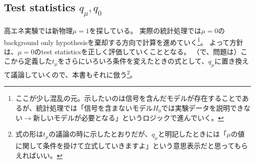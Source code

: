 \documentclass[a4paper,uplatex]{jsreport}
\begin{document}
\subsection{Test statistics $q_\mu,q_0$}
高エネ実験では新物理$\mu=1$を探している。
実際の統計処理では$\mu=0$のbackground only hypothesisを棄却する方向で計算を進めていく\footnote{ここが少し混乱の元。示したいのは信号を含んだモデルが存在することであるが、統計処理では「信号を含まないモデル$H_0$では実験データを説明できない$\to$新しいモデルが必要となる」というロジックで進んでいく。}。
よって方針は、$\mu=0$のtest statisticsを正しく評価していくこととなる。
（で、問題は）ここから定義した$t_\mu$をさらにいろいろ条件を変えたときの式として、$q_\mu$に置き換えて議論していくので、本書もそれに倣う\footnote{
式の形は$t_\mu$の議論の時に示したとおりだが、$q_\mu$と明記したときには「$\mu$の値に関して条件を掛けて立式していきますよ」という意思表示だと思ってもらえればいい。}。
\end{document}
